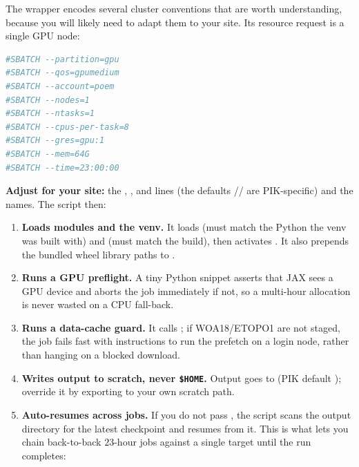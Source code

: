 The wrapper encodes several cluster conventions that are worth understanding,
because you will likely need to adapt them to your site. Its resource request is
a single GPU node:

\begin{lstlisting}[language=bash]
#SBATCH --partition=gpu
#SBATCH --qos=gpumedium
#SBATCH --account=poem
#SBATCH --nodes=1
#SBATCH --ntasks=1
#SBATCH --cpus-per-task=8
#SBATCH --gres=gpu:1
#SBATCH --mem=64G
#SBATCH --time=23:00:00
\end{lstlisting}

\noindent \textbf{Adjust for your site:} the , ,
and  lines (the defaults // are
PIK-specific) and the  names. The script then:

\begin{enumerate}
\item \textbf{Loads modules and the venv.} It loads  (must
match the Python the venv was built with) and  (must match the
 build), then activates . It also prepends the
bundled  wheel library paths to .

\item \textbf{Runs a GPU preflight.} A tiny Python snippet asserts that JAX sees
a GPU device and aborts the job immediately if not, so a multi-hour allocation
is never wasted on a CPU fall-back.

\item \textbf{Runs a data-cache guard.} It calls
; if WOA18/ETOPO1 are not staged, the job fails
fast with instructions to run the prefetch on a login node, rather than hanging
on a blocked download.

\item \textbf{Writes output to scratch, never \texttt{\$HOME}.} Output goes to
 (PIK default );
override it by exporting  to your own scratch path.

\item \textbf{Auto-resumes across jobs.} If you do not pass , the
script scans the output directory for the latest 
checkpoint and resumes from it. This is what lets you chain back-to-back $23$-hour
jobs against a single  target until the run completes:
\end{enumerate}


